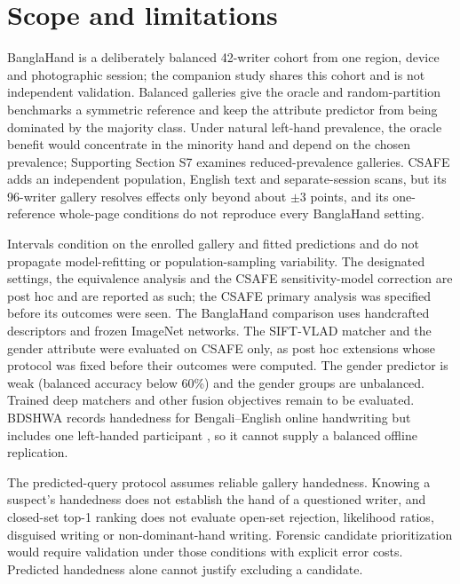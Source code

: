 \section{Scope and limitations}
\label{sec:limitations}
BanglaHand is a deliberately balanced 42-writer cohort from one region, device and photographic session; the companion study shares this cohort and is not independent validation. Balanced galleries give the oracle and random-partition benchmarks a symmetric reference and keep the attribute predictor from being dominated by the majority class. Under natural left-hand prevalence, the oracle benefit would concentrate in the minority hand and depend on the chosen prevalence; Supporting Section S7 examines reduced-prevalence galleries. CSAFE adds an independent population, English text and separate-session scans, but its 96-writer gallery resolves effects only beyond about $\pm3$ points, and its one-reference whole-page conditions do not reproduce every BanglaHand setting.

Intervals condition on the enrolled gallery and fitted predictions and do not propagate model-refitting or population-sampling variability. The designated settings, the equivalence analysis and the CSAFE sensitivity-model correction are post hoc and are reported as such; the CSAFE primary analysis was specified before its outcomes were seen. The BanglaHand comparison uses handcrafted descriptors and frozen ImageNet networks. The SIFT-VLAD matcher and the gender attribute were evaluated on CSAFE only, as post hoc extensions whose protocol was fixed before their outcomes were computed. The gender predictor is weak (balanced accuracy below 60\%) and the gender groups are unbalanced. Trained deep matchers and other fusion objectives remain to be evaluated. BDSHWA records handedness for Bengali--English online handwriting but includes one left-handed participant \cite{bdshwa2026}, so it cannot supply a balanced offline replication.

The predicted-query protocol assumes reliable gallery handedness. Knowing a suspect's handedness does not establish the hand of a questioned writer, and closed-set top-1 ranking does not evaluate open-set rejection, likelihood ratios, disguised writing or non-dominant-hand writing. Forensic candidate prioritization would require validation under those conditions with explicit error costs. Predicted handedness alone cannot justify excluding a candidate.

